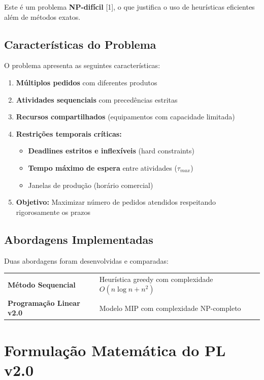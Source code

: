 \documentclass[11pt,a4paper]{article}
\begin{document}
Este é um problema \textbf{NP-difícil} [1], o que justifica o uso de heurísticas eficientes além de métodos exatos.

\subsection{Características do Problema}

O problema apresenta as seguintes características:

\begin{enumerate}
    \item \textbf{Múltiplos pedidos} com diferentes produtos
    \item \textbf{Atividades sequenciais} com precedências estritas
    \item \textbf{Recursos compartilhados} (equipamentos com capacidade limitada)
    \item \textbf{Restrições temporais críticas:}
    \begin{itemize}
        \item \textbf{Deadlines estritos e inflexíveis} (hard constraints)
        \item \textbf{Tempo máximo de espera} entre atividades ($\tau_{max}$)
        \item Janelas de produção (horário comercial)
    \end{itemize}
    \item \textbf{Objetivo:} Maximizar número de pedidos atendidos respeitando rigorosamente os prazos
\end{enumerate}

\subsection{Abordagens Implementadas}

Duas abordagens foram desenvolvidas e comparadas:

\begin{center}
\begin{tabular}{ll}
\textbf{Método Sequencial} & Heurística greedy com complexidade $O(n \log n + n^2)$ \\
\textbf{Programação Linear v2.0} & Modelo MIP com complexidade NP-completo
\end{tabular}
\end{center}

\section{Formulação Matemática do PL v2.0}
\end{document}
